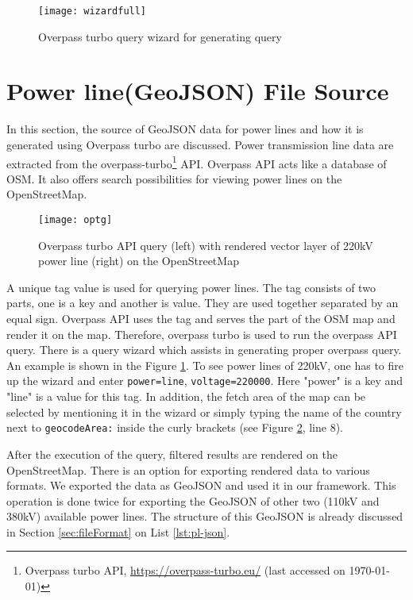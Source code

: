 \begin{figure} [H]
  \begin{center}
    \texttt{[image: wizardfull]}
    \caption{Overpass turbo query wizard for generating query}
    \label{fig:wizard}
  \end{center}
\end{figure}

\section{Power line(GeoJSON) File Source}
\label{sec:plsource}

In this section, the source of GeoJSON data for power lines and how it is generated using Overpass turbo are discussed.
Power transmission line data are extracted from the overpass-turbo\footnote{Overpass turbo API, \url{https://overpass-turbo.eu/} (last accessed on {\today})} API. Overpass API acts like a database of OSM. It also offers search possibilities for viewing power lines on the OpenStreetMap. 

\begin{figure}
  \begin{center}
    \texttt{[image: optg]}
    \caption[Overpass turbo API]{Overpass turbo API query (left) with rendered vector layer of 220kV power line (right) on the OpenStreetMap}
    \label{fig:optg}
  \end{center}
\end{figure} 

A unique tag value is used for querying power lines. The tag consists of two parts, one is a key and another is value. They are used together separated by an equal sign. Overpass API uses the tag and serves the part of the OSM map and render it on the map. Therefore, overpass turbo is used to run the overpass API query. There is a query wizard which assists in generating proper overpass query. An example is shown in the Figure \ref{fig:wizard}. To see power lines of 220kV, one has to fire up the wizard and enter \texttt{power=line}, \texttt{voltage=220000}. Here "power" is a key and "line" is a value for this tag. In addition, the fetch area of the map can be selected by mentioning it in the wizard or simply typing the name of the country next to \texttt{geocodeArea:} inside the curly brackets (see Figure \ref{fig:optg}, line 8).

After the execution of the query, filtered results are rendered on the OpenStreetMap. There is an option for exporting rendered data to various formats. We exported the data as GeoJSON and used it in our framework. This operation is done twice for exporting the GeoJSON of other two (110kV and 380kV) available power lines. The structure of this GeoJSON is already discussed in Section \ref{sec:fileFormat} on List \ref{lst:pl-json}.

 